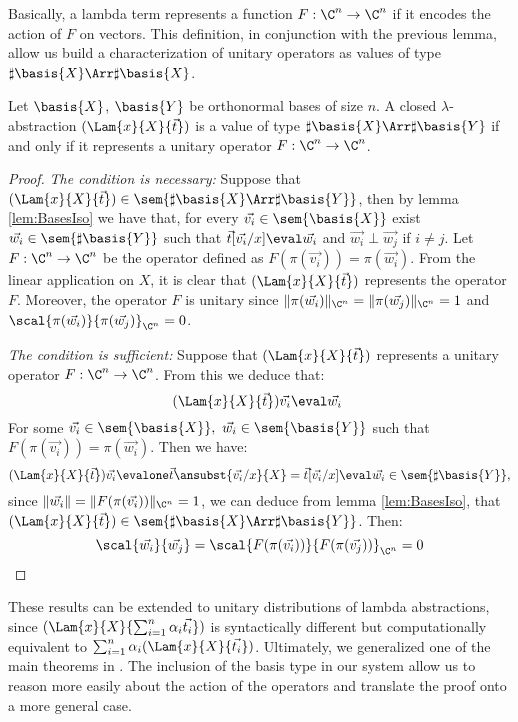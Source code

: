 Basically, a lambda term represents a function $F:\C^n\to\C^n$ if it encodes the action of $F$ on vectors. This definition, in conjunction with the previous lemma, allow us build a characterization of unitary operators as values of type $\sharp\basis{X}\Arr\sharp\basis{X}$.

\begin{theorem}
  Let $\basis{X}$, $\basis{Y}$ be orthonormal bases of size $n$. A closed $\lambda$-abstraction $(\Lam{x}{X}{\vec{t}})$ is a value of type $\sharp\basis{X}\Arr\sharp\basis{Y}$ if and only if it represents a unitary operator $F:\C^n\to\C^n$.
\end{theorem}

\begin{proof}
  \textit{The condition is necessary:} Suppose that $(\Lam{x}{X}{\vec{t}})\in\sem{\sharp\basis{X}\Arr\sharp\basis{Y}}$, then by lemma \ref{lem:BasesIso} we have that, for every $\vec{v_i}\in\sem{\basis{X}}$ exist $\vec{w_i}\in\sem{\sharp\basis{Y}}$ such that $\vec{t}[\vec{v_i}/x]\eval\vec{w_i}$ and $\vec{w_i}\perp\vec{w_j}$ if $i\neq j$. Let $F:\C^n\to\C^n$ be the operator defined as $F(\pi(\vec{v_i}))=\pi(\vec{w_i})$. From the linear application on $X$, it is clear that $(\Lam{x}{X}{\vec{t}})$ represents the operator $F$. Moreover, the operator $F$ is unitary since $\|\pi(\vec{w_i})\|_{\C^n}=\|\pi(\vec{w_j})\|_{\C^n}=1$ and $\scal{\pi(\vec{w_i})}{\pi(\vec{w_j})}_{\C^n}=0$.

  \textit{The condition is sufficient:} Suppose that $(\Lam{x}{X}{\vec{t}})$ represents a unitary operator $F:\C^n\to\C^n$. From this we deduce that:
  \[
  (\Lam{x}{X}{\vec{t}})\vec{v_i}\eval\vec{w_i}\
  \]
  For some $\vec{v_i}\in\sem{\basis{X}},\ \vec{w_i}\in\sem{\basis{Y}}$ such that $F(\pi(\vec{v_i})) = \pi(\vec{w_i})$. Then we have:
  \[
    (\Lam{x}{X}{\vec{t}})\vec{v_i}\evalone\vec{t}\ansubst{\vec{v_i}/x}{X} = \vec{t}[\vec{v_i}/x]\eval\vec{w_i}\in\sem{\sharp\basis{Y}},
  \]
  since $\|\vec{w_i}\|=\|F(\pi(\vec{v_i}))\|_{\C^n} = 1$, we can deduce from lemma \ref{lem:BasesIso}, that $(\Lam{x}{X}{\vec{t}})\in\sem{\sharp\basis{X}\Arr\sharp\basis{Y}}$. Then:
  \[
  \scal{\vec{w_i}}{\vec{w_j}}=\scal{F(\pi(\vec{v_i}))}{F(\pi(\vec{v_j}))}_{\C^n} = 0
  \]
\end{proof}

These results can be extended to unitary distributions of lambda abstractions, since $(\Lam{x}{X}{\sum_{i=1}^{n}\alpha_i \vec{t_i}})$ is syntactically different but computationally equivalent to $\sum_{i=1}^{n}\alpha_i (\Lam{x}{X}{\vec{t_i}})$. Ultimately, we generalized one of the main theorems in \cite{DiazcaroGuillermoMiquelValironLICS19}. The inclusion of the basis type in our system allow us to reason more easily about the action of the operators and translate the proof onto a more general case. 
